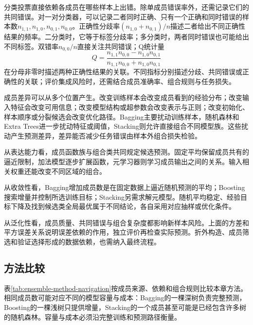 分类投票直接依赖各成员在哪些样本上出错。除单成员错误率外，还需记录它们的共同错误。对一对分类器，可以记录二者同时正确、只有一个正确和同时错误的样本数$n_{1,1},n_{1,0},n_{0,1},n_{0,0}$。正确性分歧率$(n_{1,0}+n_{0,1})/n$描述二者给出不同正确性结果的频率。二分类时，它等于标签分歧率；多分类时，两者同时错误也可能给出不同标签。双错率$n_{0,0}/n$直接关注共同错误；Q统计量
\[
  Q=
  \frac{n_{1,1}n_{0,0}-n_{1,0}n_{0,1}}
       {n_{1,1}n_{0,0}+n_{1,0}n_{0,1}}
\]
在分母非零时描述两种正确性结果的关联。不同指标分别描述分歧、共同错误或正确性的关联；评价集成风险时，还需结合成员准确率、组合规则与任务损失。

成员差异可以从多个位置产生。改变训练样本会改变成员看到的经验分布；改变输入特征会改变可用信息；改变模型结构或超参数会改变表示与正则；改变初始化、样本顺序或分裂候选会改变优化路径。Bagging主要扰动训练样本，随机森林和Extra Trees进一步扰动特征或阈值，Stacking则允许直接组合不同模型族。这些扰动产生预测差异，差异能否减少任务错误由样本外组合损失检验。

从表达能力看，成员函数族与组合类共同规定候选预测。固定平均保留成员共有的逼近限制，加法模型逐步扩展函数，元学习器则学习成员输出之间的关系。输入相关权重还能改变不同区域的组合。

从收敛性看，Bagging增加成员数是在固定数据上逼近随机预测的平均；Boosting搜索增量并控制所选训练目标；Stacking另需求解元模型。随机平均稳定、经验目标下降及找到候选类全局最优属于不同结论，各自采用对应抽样或优化条件。

从泛化性看，成员质量、共同错误与组合复杂度都影响新样本风险。上面的方差和平方误差关系说明误差依赖的作用，独立评价再检查实际预测。折外构造、成员筛选和验证选择形成的数据依赖，也需纳入最终流程。


\subsection{方法比较}
\label{sec:ensemble-method-comparison}

表\ref{tab:ensemble-method-navigation}按成员来源、依赖和组合规则比较本章方法。相同成员数可能对应不同的模型容量与成本：Bagging的一棵深树负责完整预测，Boosting的一棵浅树只提供增量，Stacking的一个成员甚至可能是已经包含许多树的随机森林。容量与成本必须沿完整训练和预测路径衡量。

